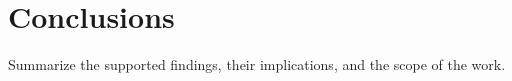 \section{Conclusions}\label{sec:conclusions}
Summarize the supported findings, their implications, and the scope of
the work.
